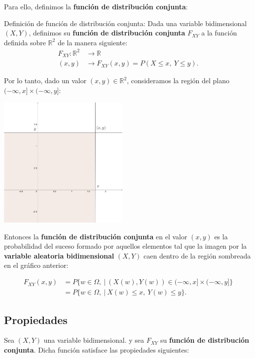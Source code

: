 \documentclass[
  letterpaper,
  DIV=11,
  numbers=noendperiod]{scrreprt}
\begin{document}
Para ello, definimos la \textbf{función de distribución conjunta}:

Definición de función de distribución conjunta: Dada una variable
bidimensional \((X,Y)\), definimos su \textbf{función de distribución
conjunta} \(F_{XY}\) a la función definida sobre \(\mathbb{R}^2\) de la
manera siguiente: \[
\begin{array}{rl}
F_{XY}: \mathbb{R}^2 & \longrightarrow \mathbb{R}\\
(x,y) & \longrightarrow F_{XY}(x,y)=P(X\leq x,\ Y\leq y).
\end{array}
\]

Por lo tanto, dado un valor \((x,y)\in \mathbb{R}^2\), consideramos la
región del plano \((-\infty,x]\times (-\infty,y]\):

\includegraphics[width=2.5in,height=\textheight]{Images/Fxy.png}

Entonces la \textbf{función de distribución conjunta} en el valor
\((x,y)\) es la probabilidad del suceso formado por aquellos elementos
tal que la imagen por la \textbf{variable aleatoria bidimensional}
\((X,Y)\) caen dentro de la región sombreada en el gráfico anterior:

\[
\begin{array}{rl}
F_{XY}(x,y) &= P\{w\in\Omega,\ |\ (X(w),Y(w))\in (-\infty,x]\times (-\infty,y]\} \\ 
&= P\{w\in\Omega,\ |\ X(w)\leq x,\ Y(w)\leq y\}.
\end{array}
\]

\hypertarget{propiedades-4}{%
\subsection{Propiedades}\label{propiedades-4}}

Sea \((X,Y)\) una variable bidimensional. y sea \(F_{XY}\) su
\textbf{función de distribución conjunta}. Dicha función satisface las
propiedades siguientes:
\end{document}
